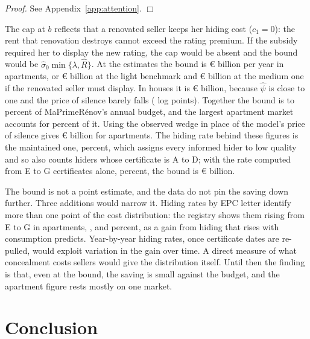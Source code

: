 \documentclass[10pt,letterpaper]{bp-template-concise}
\begin{document}
\noindent\textit{Proof.} See Appendix~\ref{app:attention}. $\Box$

\medskip

The cap at $b$ reflects that a renovated seller keeps her hiding cost ($c_1=0$): the rent that renovation destroys cannot exceed the rating premium. If the subsidy required her to display the new rating, the cap would be absent and the bound would be $\hat\sigma_0\min\{\lambda,\hat R\}$. At the estimates the bound is \euro{}\attSavingUbTwoFiftyApt{} billion per year in apartments, or \euro{}\attSavingUbDTwoFiftyApt{} billion at the light benchmark and \euro{}\attSavingUbDFiveHundredApt{} billion at the medium one if the renovated seller must display. In houses it is \euro{}\attSavingUbTwoFiftyHouse{} billion, because $\hat\psi$ is close to one and the price of silence barely falls (\attSalienceHouse{} log points). Together the bound is \attSavingUbTotTwoFiftyLo{} to \attSavingUbTotTwoFiftyHi{} percent of MaPrimeR\'enov's annual budget, and the largest apartment market accounts for \attSavingTopShareApt{} percent of it. Using the observed wedge in place of the model's price of silence gives \euro{}\attSavingUbObsTwoFiftyApt{} billion for apartments. The hiding rate behind these figures is the maintained one, \attSigmaObsApt{} percent, which assigns every informed hider to low quality and so also counts hiders whose certificate is A to D; with the rate computed from E to G certificates alone, \attSigmaRegMeanApt{} percent, the bound is \euro{}\attSavingUbRegTwoFiftyApt{} billion.

The bound is not a point estimate, and the data do not pin the saving down further. Three additions would narrow it. Hiding rates by EPC letter identify more than one point of the cost distribution: the registry shows them rising from E to G in apartments, \attHideLetterEApt{}, \attHideLetterFApt{} and \attHideLetterGApt{} percent, as a gain from hiding that rises with consumption predicts. Year-by-year hiding rates, once certificate dates are re-pulled, would exploit variation in the gain over time. A direct measure of what concealment costs sellers would give the distribution itself. Until then the finding is that, even at the bound, the saving is small against the budget, and the apartment figure rests mostly on one market.

\section{Conclusion}
\end{document}
